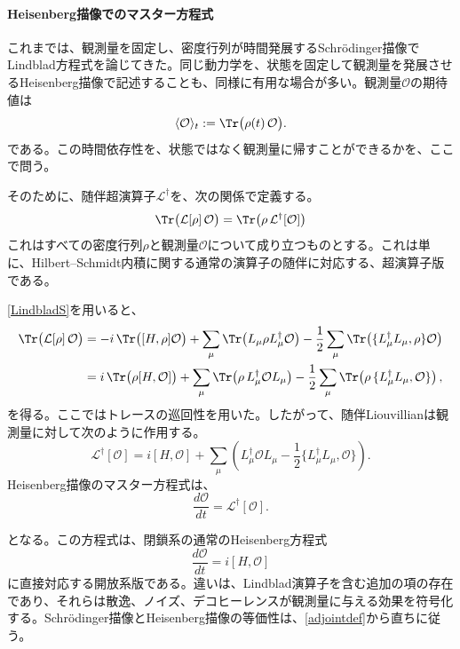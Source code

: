 \documentclass[a4paper,11pt,oneside]{article}
\theoremstyle{definition}
\numberwithin{equation}{section}
\renewcommand{\O}{\mathcal{O}}
\begin{document}
\paragraph{Heisenberg描像でのマスター方程式}



これまでは、観測量を固定し、密度行列が時間発展するSchr\"odinger描像でLindblad方程式を論じてきた。同じ動力学を、状態を固定して観測量を発展させるHeisenberg描像で記述することも、同様に有用な場合が多い。観測量$\O$の期待値は
\begin{equation}
\langle \O \rangle_t := \Tr\bigl(\rho(t)\,\O\bigr) .
\end{equation}
である。この時間依存性を、状態ではなく観測量に帰すことができるかを、ここで問う。



そのために、随伴超演算子$\mathcal L^\dagger$を、次の関係で定義する。
\begin{equation}\label{adjointdef}
\Tr\bigl(\mathcal L[\rho]\,\O\bigr)
=
\Tr\bigl(\rho\,\mathcal L^\dagger[\O]\bigr)
\end{equation}
これはすべての密度行列$\rho$と観測量$\O$について成り立つものとする。これは単に、Hilbert--Schmidt内積に関する通常の演算子の随伴に対応する、超演算子版である。



\eqref{LindbladS}を用いると、
\begin{align}
\Tr\bigl(\mathcal L[\rho]\,\O\bigr)
&=
-i\,\Tr\bigl([H,\rho]\O\bigr)
+
\sum_\mu
\Tr\!\left(L_\mu \rho L_\mu^\dagger \O\right)
-
\frac12
\sum_\mu
\Tr\!\left(\{L_\mu^\dagger L_\mu,\rho\}\O\right)
\nonumber\\
&=
i\,\Tr\bigl(\rho[H,\O]\bigr)
+
\sum_\mu
\Tr\!\left(\rho\,L_\mu^\dagger \O L_\mu\right)
-
\frac12
\sum_\mu
\Tr\!\left(\rho\,\{L_\mu^\dagger L_\mu,\O\}\right) ,
\end{align}
を得る。ここではトレースの巡回性を用いた。したがって、随伴Liouvillianは観測量に対して次のように作用する。
\begin{equation}\label{LindbladH}
\mathcal L^\dagger[\O]
=
i[H,\O]
+
\sum_\mu
\left(
L_\mu^\dagger \O L_\mu
-\frac12 \{L_\mu^\dagger L_\mu,\O\}
\right) .
\end{equation}
Heisenberg描像のマスター方程式は、
\begin{equation}\label{Heisenbergmaster}
\frac{d\O}{dt} = \mathcal L^\dagger[\O] .
\end{equation}


となる。この方程式は、閉鎖系の通常のHeisenberg方程式
\begin{equation}
\frac{d\O}{dt}= i[H,\O]
\end{equation}
に直接対応する開放系版である。違いは、Lindblad演算子を含む追加の項の存在であり、それらは散逸、ノイズ、デコヒーレンスが観測量に与える効果を符号化する。Schr\"odinger描像とHeisenberg描像の等価性は、\eqref{adjointdef}から直ちに従う。
\end{document}
